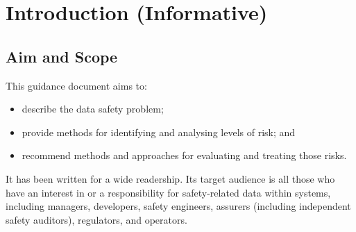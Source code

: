 %
%

%
%
\setcounter{page}{1}
\pagestyle{Standard} %
\thispagestyle{FirstPage}

\section{Introduction (Informative)} \label{bkm:introduction}


\subsection{Aim and Scope}
This guidance document aims to:
\begin{itemize}
	\item describe the data safety problem;
	\item provide methods for identifying and analysing levels of risk; and
	\item recommend methods and approaches for evaluating and treating those risks.
\end{itemize}

It has been written for a wide readership. Its target audience is all those who have an interest in or a responsibility for safety-related data within systems, including managers, developers, safety engineers, assurers (including independent safety auditors), regulators, and operators. 

